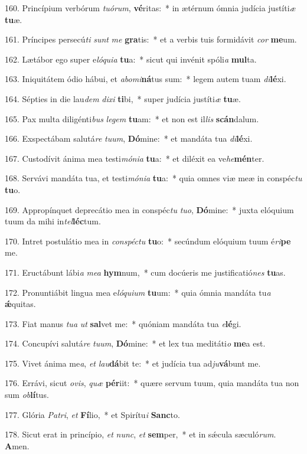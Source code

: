 160. Princípium verbórum \textit{tu}\textit{ó}\textit{rum}, \textbf{vé}ritas:~*  in ætérnum ómnia judícia justíti\textit{æ} \textbf{tu}æ.\

161. Príncipes persecú\textit{ti} \textit{sunt} \textit{me} \textbf{gra}tis:~*  et a verbis tuis formidávit \textit{cor} \textbf{me}um.\

162. Lætábor ego super e\textit{ló}\textit{qui}\textit{a} \textbf{tu}a:~*  sicut qui invénit spóli\textit{a} \textbf{mul}ta.\

163. Iniquitátem ódio hábui, et \textit{ab}\textit{o}\textit{mi}\textbf{ná}tus sum:~*  legem autem tuam \textit{di}\textbf{lé}xi.\

164. Sépties in die lau\textit{dem} \textit{di}\textit{xi} \textbf{ti}bi,~*  super judícia justíti\textit{æ} \textbf{tu}æ.\

165. Pax multa diligénti\textit{bus} \textit{le}\textit{gem} \textbf{tu}am:~*  et non est il\textit{lis} \textbf{scán}dalum.\

166. Exspectábam salutá\textit{re} \textit{tu}\textit{um}, \textbf{Dó}mine:~*  et mandáta tua \textit{di}\textbf{lé}xi.\

167. Custodívit ánima mea testi\textit{mó}\textit{ni}\textit{a} \textbf{tu}a:~*  et diléxit ea ve\textit{he}\textbf{mén}ter.\

168. Servávi mandáta tua, et testi\textit{mó}\textit{ni}\textit{a} \textbf{tu}a:~*  quia omnes viæ meæ in conspéc\textit{tu} \textbf{tu}o.\

169. Appropínquet deprecátio mea in conspéc\textit{tu} \textit{tu}\textit{o}, \textbf{Dó}mine:~*  juxta elóquium tuum da mihi in\textit{tel}\textbf{léc}tum.\

170. Intret postulátio mea in \textit{con}\textit{spéc}\textit{tu} \textbf{tu}o:~*  secúndum elóquium tuum é\textit{ri}\textbf{pe} me.\

171. Eructábunt lábi\textit{a} \textit{me}\textit{a} \textbf{hym}num,~*  cum docúeris me justificatió\textit{nes} \textbf{tu}as.\

172. Pronuntiábit lingua mea e\textit{ló}\textit{qui}\textit{um} \textbf{tu}um:~*  quia ómnia mandáta tu\textit{a} \textbf{ǽ}quitas.\

173. Fiat manus \textit{tu}\textit{a} \textit{ut} \textbf{sal}vet me:~*  quóniam mandáta tua \textit{e}\textbf{lé}gi.\

174. Concupívi salutá\textit{re} \textit{tu}\textit{um}, \textbf{Dó}mine:~*  et lex tua meditáti\textit{o} \textbf{me}a est.\

175. Vivet ánima me\textit{a}, \textit{et} \textit{lau}\textbf{dá}bit te:~*  et judícia tua ad\textit{ju}\textbf{vá}bunt me.\

176. Errávi, sicut \textit{o}\textit{vis}, \textit{quæ} \textbf{pér}iit:~*  quære servum tuum, quia mandáta tua non sum \textit{ob}\textbf{lí}tus.\

177. Glória \textit{Pa}\textit{tri}, \textit{et} \textbf{Fí}lio,~*  et Spirítu\textit{i} \textbf{Sanc}to.\

178. Sicut erat in princípio, \textit{et} \textit{nunc}, \textit{et} \textbf{sem}per,~*  et in sǽcula sæculó\textit{rum}. \textbf{A}men.\

